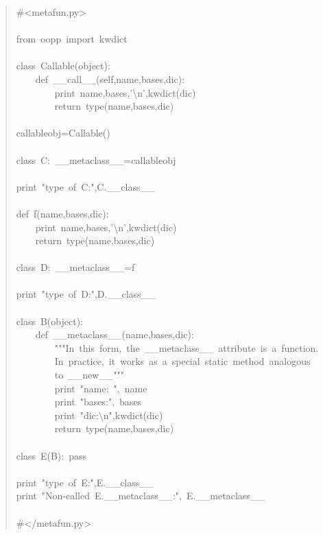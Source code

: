 \documentclass[10pt,english]{article}
\begin{document}
\begin{quote}
\begin{ttfamily}\begin{flushleft}
\mbox{{\#}<metafun.py>}\\
\mbox{}\\
\mbox{from~oopp~import~kwdict}\\
\mbox{}\\
\mbox{class~Callable(object):}\\
\mbox{~~~~def~{\_}{\_}call{\_}{\_}(self,name,bases,dic):}\\
\mbox{~~~~~~~~print~name,bases,'{\textbackslash}n',kwdict(dic)}\\
\mbox{~~~~~~~~return~type(name,bases,dic)}\\
\mbox{}\\
\mbox{callableobj=Callable()}\\
\mbox{}\\
\mbox{class~C:~{\_}{\_}metaclass{\_}{\_}=callableobj}\\
\mbox{}\\
\mbox{print~"type~of~C:",C.{\_}{\_}class{\_}{\_}}\\
\mbox{}\\
\mbox{def~f(name,bases,dic):}\\
\mbox{~~~~print~name,bases,'{\textbackslash}n',kwdict(dic)}\\
\mbox{~~~~return~type(name,bases,dic)}\\
\mbox{}\\
\mbox{class~D:~{\_}{\_}metaclass{\_}{\_}=f}\\
\mbox{}\\
\mbox{print~"type~of~D:",D.{\_}{\_}class{\_}{\_}}\\
\mbox{}\\
\mbox{class~B(object):}\\
\mbox{~~~~def~{\_}{\_}metaclass{\_}{\_}(name,bases,dic):}\\
\mbox{~~~~~~~~"""In~this~form,~the~{\_}{\_}metaclass{\_}{\_}~attribute~is~a~function.~}\\
\mbox{~~~~~~~~In~practice,~it~works~as~a~special~static~method~analogous~}\\
\mbox{~~~~~~~~to~{\_}{\_}new{\_}{\_}"""}\\
\mbox{~~~~~~~~print~"name:~",~name}\\
\mbox{~~~~~~~~print~"bases:",~bases}\\
\mbox{~~~~~~~~print~"dic:{\textbackslash}n",kwdict(dic)}\\
\mbox{~~~~~~~~return~type(name,bases,dic)}\\
\mbox{}\\
\mbox{class~E(B):~pass}\\
\mbox{}\\
\mbox{print~"type~of~E:",E.{\_}{\_}class{\_}{\_}}\\
\mbox{print~"Non-called~E.{\_}{\_}metaclass{\_}{\_}:",~E.{\_}{\_}metaclass{\_}{\_}}\\
\mbox{}\\
\mbox{{\#}</metafun.py>}
\end{flushleft}\end{ttfamily}
\end{quote}
\end{document}
